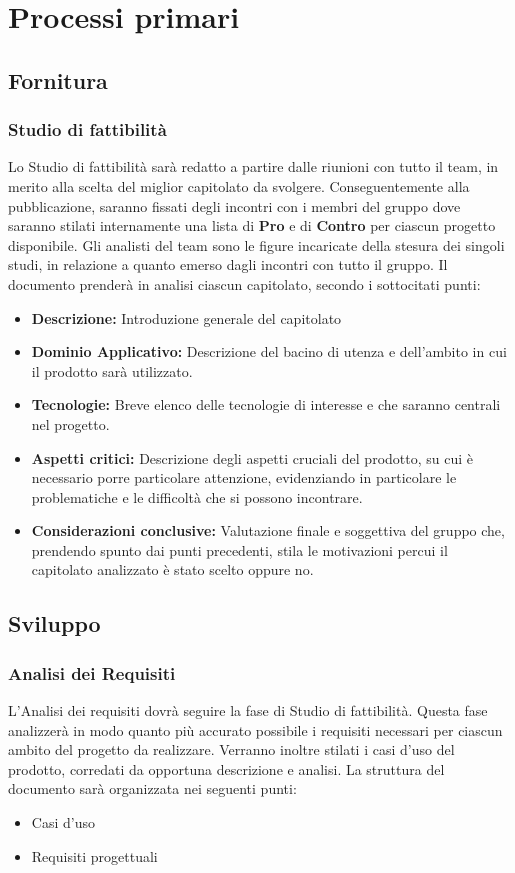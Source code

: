 \section{Processi primari}
\subsection{Fornitura}

\subsubsection{Studio di fattibilità}
Lo Studio di fattibilità sarà redatto a partire dalle riunioni con tutto il team, 
in merito alla scelta del miglior capitolato da svolgere. Conseguentemente alla pubblicazione,
saranno fissati degli incontri con i membri del gruppo dove saranno stilati internamente una lista
di \textbf{Pro} e di \textbf{Contro} per ciascun progetto disponibile. Gli analisti del team sono le figure
incaricate della stesura dei singoli studi, in relazione a quanto emerso dagli incontri con tutto il gruppo.
Il documento prenderà in analisi ciascun capitolato, secondo i sottocitati punti:
\begin{itemize}
	\item \textbf{Descrizione:} Introduzione generale del capitolato
	\item \textbf{Dominio Applicativo:} Descrizione del bacino di utenza e dell'ambito in cui il prodotto sarà utilizzato.
	\item \textbf{Tecnologie:} Breve elenco delle tecnologie di interesse e che saranno centrali nel progetto.
	\item \textbf{Aspetti critici:} Descrizione degli aspetti cruciali del prodotto, su cui è necessario porre particolare attenzione,
	evidenziando in particolare le problematiche e le difficoltà che si possono incontrare.
	\item \textbf{Considerazioni conclusive:} Valutazione finale e soggettiva del gruppo che, prendendo spunto dai punti precedenti, stila
	le motivazioni percui il capitolato analizzato è stato scelto oppure no.
\end{itemize}

\subsection{Sviluppo}
\subsubsection{Analisi dei Requisiti}
L'Analisi dei requisiti dovrà seguire la fase di Studio di fattibilità. Questa fase analizzerà in modo quanto più
accurato possibile i requisiti necessari per ciascun ambito del progetto da realizzare. Verranno inoltre stilati
i casi d'uso del prodotto, corredati da opportuna descrizione e analisi. La struttura
del documento sarà organizzata nei seguenti punti:
\begin{itemize}
	\item Casi d'uso
	\item Requisiti progettuali
\end{itemize}

